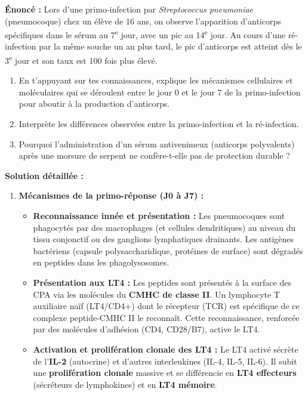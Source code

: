 \documentclass[11pt]{article}
\begin{document}
\begin{exoresolu}
    \textbf{Énoncé :} Lors d'une primo-infection par \emph{Streptococcus pneumoniae} (pneumocoque) chez un élève de 16 ans, on observe l'apparition d'anticorps spécifiques dans le sérum au 7\textsuperscript{e} jour, avec un pic au 14\textsuperscript{e} jour. Au cours d'une ré-infection par la même souche un an plus tard, le pic d'anticorps est atteint dès le 3\textsuperscript{e} jour et son taux est 100 fois plus élevé.
    \begin{enumerate}
        \item En t'appuyant sur tes connaissances, explique les mécanismes cellulaires et moléculaires qui se déroulent entre le jour 0 et le jour 7 de la primo-infection pour aboutir à la production d'anticorps.
        \item Interprète les différences observées entre la primo-infection et la ré-infection.
        \item Pourquoi l'administration d'un sérum antivenimeux (anticorps polyvalents) après une morsure de serpent ne confère-t-elle pas de protection durable ?
    \end{enumerate}
    \tcblower
    \textbf{Solution détaillée :}
    \begin{enumerate}
        \item \textbf{Mécanismes de la primo-réponse (J0 à J7) :}
        \begin{itemize}
            \item \textbf{Reconnaissance innée et présentation :} Les pneumocoques sont phagocytés par des macrophages (et cellules dendritiques) au niveau du tissu conjonctif ou des ganglions lymphatiques drainants. Les antigènes bactériens (capsule polysaccharidique, protéines de surface) sont dégradés en peptides dans les phagolysosomes.
            \item \textbf{Présentation aux LT4 :} Les peptides sont présentés à la surface des CPA via les molécules du \textbf{CMHC de classe II}. Un lymphocyte T auxiliaire naïf (LT4/CD4+) dont le récepteur (TCR) est spécifique de ce complexe \og peptide-CMHC II \fg le reconnaît. Cette reconnaissance, renforcée par des molécules d'adhésion (CD4, CD28/B7), active le LT4.
            \item \textbf{Activation et prolifération clonale des LT4 :} Le LT4 activé sécrète de l'\textbf{IL-2} (autocrine) et d'autres interleukines (IL-4, IL-5, IL-6). Il subit une \textbf{prolifération clonale} massive et se différencie en \textbf{LT4 effecteurs} (sécréteurs de lymphokines) et en \textbf{LT4 mémoire}.

\end{itemize}
\end{enumerate}
\end{exoresolu}
\end{document}

